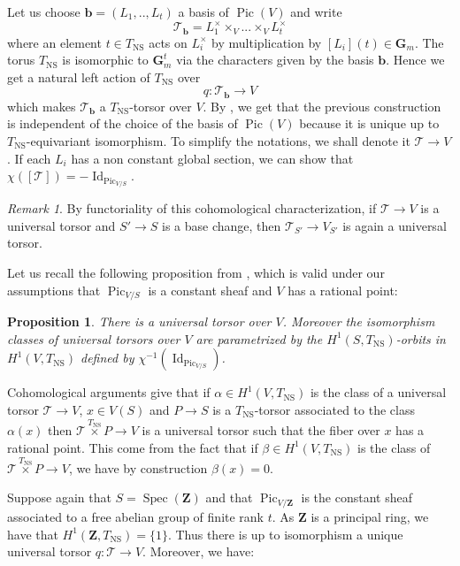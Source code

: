 \documentclass{proc-l}
\newcommand{\Z}{\mathbf{Z}}
\newcommand{\G}{\mathbf{G}}
\newcommand{\base}{\mathbf{b}}
\DeclareMathOperator{\Spec}{Spec}
\DeclareMathOperator{\Pic}{Pic}
\DeclareMathOperator{\id}{Id}
\DeclareMathOperator{\NS}{NS}
\newcommand{\stackT}{\mathcal{T}}
\newtheorem{prop}[theorem]{Proposition}
\theoremstyle{definition}
\theoremstyle{remark}
\newtheorem{remark}[theorem]{Remark}
\numberwithin{equation}{section}
\begin{document}
Let us choose $\base = (L_1,..,L_t)$ a basis of $\Pic(V)$ and write $$\stackT_{\base} = L_1^{\times} \times_V ... \times_V L_t^{\times} $$where an element $t \in T_{\NS}$ acts on $L_i^{\times}$ by multiplication by $[L_i](t) \in \G_m$. The torus $T_{\NS}$ is isomorphic to $\G_m^t$ via the characters given by the basis $\base$. Hence we get a natural left action of $T_{\NS}$ over $$q: \stackT_{\base} \rightarrow V$$ which makes $\stackT_{\base}$ a $T_{ \NS}$-torsor over $V$. By \cite[proposition 8.1]{peyre_counting_points_torsors}, we get that the previous construction is independent of the choice of the basis of $\Pic(V)$ because it is unique up to $T_{ \NS}$-equivariant isomorphism. To simplify the notations, we shall denote it $\stackT \rightarrow V$. If each $L_i$ has a non constant global section, we can show that $\chi([\stackT]) = - \id_{\Pic_{V/S}}$.

 

\begin{remark}
    By functoriality of this cohomological characterization, if $\stackT \rightarrow V$ is a universal torsor and $S' \rightarrow S$ is a base change, then $\stackT_{S'} \rightarrow V_{S'}$ is again a universal torsor.
\end{remark}

Let us recall the following proposition from \cite[proposition 5.15]{salberger_torsor}, which is valid under our assumptions that $\Pic_{V/S}$ is a constant sheaf and $V$ has a rational point:

\begin{prop}
    There is a universal torsor over $V$. Moreover the isomorphism classes of universal torsors over $V$ are parametrized by the $H^1(S,T_{\NS})$-orbits in $H^1(V,T_{\NS})$ defined by $\chi^{-1}(\id_{\Pic_{V/S}})$.
\end{prop}

Cohomological arguments give that if $\alpha \in H^1(V,T_{\NS})$ is the class of a universal torsor $\stackT \rightarrow V$, $x \in V(S)$ and $P \rightarrow S$ is a $T_{\NS}$-torsor associated to the class $\alpha(x)$ then $\stackT \overset{T_{\NS}}{\times} P \rightarrow V$ is a universal torsor such that the fiber over $x$ has a rational point. This come from the fact that if $\beta \in H^1(V,T_{\NS}) $ is the class of $\stackT \overset{T_{\NS}}{\times} P \rightarrow V$, we have by construction $\beta(x) = 0$.

Suppose again that $S = \Spec(\Z)$ and that $\Pic_{V/\Z}$ is the constant sheaf associated to a free abelian group of finite rank $t$. As $\Z$ is a principal ring, we have that $H^1(\Z,T_{\NS} ) = \{1\}$. Thus there is up to isomorphism a unique universal torsor $q : \stackT \rightarrow V$. Moreover, we have:
\end{document}
